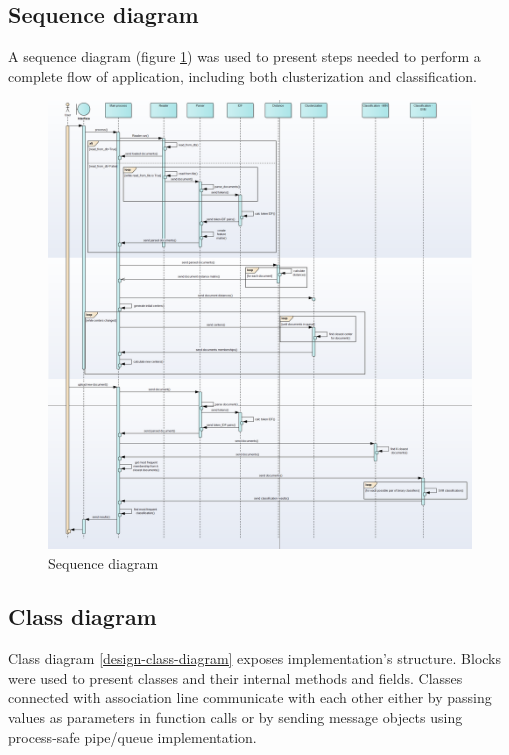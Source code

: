 \subsection{Sequence diagram}
A sequence diagram (figure \ref{design-sequence-diagram-full}) was used to present steps needed to perform a complete flow of application, including both clusterization and classification.
\begin{figure}[H]
	\begin{center}
		\includegraphics[width=1.0\linewidth]{images/diagrams/seq-full.png}
		\caption{Sequence diagram}
		\label{design-sequence-diagram-full}
	\end{center}
\end{figure}

\subsection{Class diagram}
Class diagram \ref{design-class-diagram} exposes implementation's structure. Blocks were used to present classes and their internal methods and fields. Classes connected with association line communicate with each other either by passing values as parameters in function calls or by sending message objects using process-safe pipe/queue implementation. 

